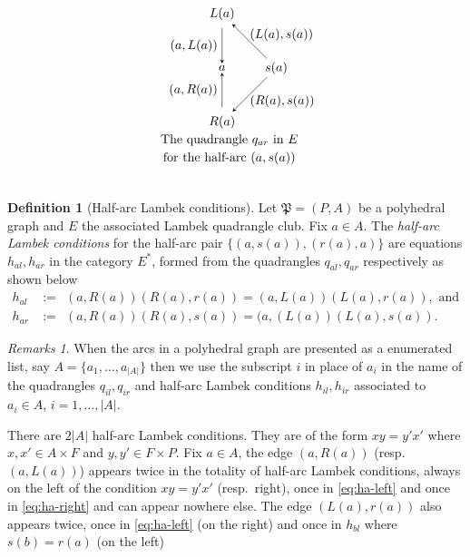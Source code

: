 \documentclass[12pt]{amsart}
\theoremstyle{definition}
\newtheorem{dfn}[thm]{Definition}
\theoremstyle{remark}
\newtheorem{rmks}[thm]{Remarks}
\numberwithin{equation}{section}
\begin{document}
\begin{equation}
\begin{array}{ll}
\begin{tikzpicture}
\begin{scope}[xshift=6.5cm]
\end{scope}

\begin{scope}[xshift=11cm]

\node at (0.2,-2) {\text{The quadrangle $q_{a r}$ in $E$}};
\node at (0.2,-2.5) {\text{for the half-arc $(a,s(a))$}};
\node at (0,-3) { };
\node[circle, inner sep=0pt] (t) at (0,1.5) {\small $L(a)$};
\node[circle, inner sep=0pt] (l) at (0,0) {\small $a$};
\node[circle, inner sep=0pt] (r) at (1.5,0) {\small $s(a)$};
\node[circle, inner sep=0pt] (b) at (0,-1.5) {\small $R(a)$};
\draw[-stealth] (t)--(l) node[inner sep=0pt, pos=0.5, left] {\small $(a,L(a)) \ $};
\draw[-stealth] (r)--(t) node[inner sep=0pt, pos=0.5, anchor=south west] {\small $(L(a),s(a))$};
\draw[-stealth] (b)--(l) node[inner sep=0pt, pos=0.5, left] {\small $(a,R(a)) \ $};
\draw[-stealth] (r)--(b) node[inner sep=0pt, pos=0.5, anchor=north west] {\small $(R(a),s(a))$};

\end{scope}

\end{tikzpicture} \\
\end{array}
\end{equation}


\begin{dfn}[Half-arc Lambek conditions]
Let $\mathfrak{P}=(P,A)$ be a polyhedral graph and $E$ the associated Lambek quadrangle club. Fix $a \in A$. The \emph{half-arc Lambek conditions} for the half-arc pair $\{ (a,s(a)), (r(a),a) \}$ are equations $h_{al}, h_{ar}$ in the category $E^*$, formed from the quadrangles $q_{a l}, q_{a r}$ respectively as shown below
\begin{align} 
h_{a l} &:=  ~~ (a,R(a)) (R(a),r(a)) = (a,L(a)) (L(a),r(a)) ,  \text{ and } \label{eq:ha-left} \\
h_{a r} &:= ~~(a,R(a))  (R(a),s(a)) = (a,(L(a)) (L(a),s(a)) . \label{eq:ha-right}
\end{align}
\end{dfn}


\begin{rmks} \label{rmks:half-arc-count}
When the arcs in a polyhedral graph are presented as a enumerated list, say $A = \{ a_1 , \ldots , a_{|A|} \}$ then we use the subscript $i$ in place of $a_i$ in the name of the quadrangles $q_{il}, q_{ir}$ and half-arc Lambek conditions $h_{il}, h_{ir}$ associated to $a_i \in A$, $i=1, \ldots , |A|$.

There are $2|A|$ half-arc Lambek conditions. They are of the form $xy=y'x'$ where $x,x' \in A \times F$ and $y,y'\in F \times P$. Fix $a\in A$, the edge $(a,R(a))$ (resp.\ $(a,L(a))$) appears twice in the totality of half-arc Lambek conditions, always on the left of the condition $xy=y'x'$ (resp.\ right), once in \eqref{eq:ha-left} and once in \eqref{eq:ha-right} and can appear nowhere else. The edge $(L(a),r(a))$ also appears twice, once in \eqref{eq:ha-left} (on the right) and once in $h_{bl}$ where $s(b) =r(a)$ (on the left)%
\end{rmks}
\end{document}
